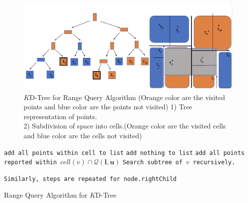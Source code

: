 \begin{figure}[htp]
    \centering
    \includegraphics[width=1.0\textwidth]{graphs/KD_Tree_Range_Query_Algorithm.png}
    \caption{$K$D-Tree for Range Query Algorithm (Orange color are the visited points and blue color are the points not visited) 
    1) Tree representation of points. \\
    2) Subdivision of space into cells.(Orange color are the visited cells and blue color are the cells not visited) 
    }
    \label{fig:KD-Tree_for_Range_Query_Algorithm}
\end{figure}




\begin{algorithm}[H]
    \SetAlgoLined
        {
                {\texttt{add all points within cell to list}}
                {\texttt{add nothing to list}}
            {\texttt{add all points reported within $cell(v) \cap \mathcal{Q}(\boldsymbol{l}, \boldsymbol{u})$}}
        }
        {
            \texttt{Search subtree of $v$ recursively.}
        }
        
    \texttt{Similarly, steps are repeated for node.rightChild}
    
    \caption{Range Query Algorithm for $K$D-Tree}
    \label{Range_Query_Algorithm_$K$D-Tree}
\end{algorithm}

